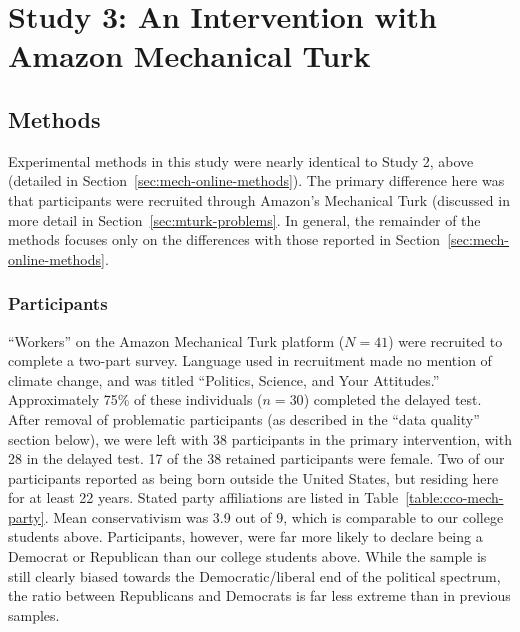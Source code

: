 \section{Study 3: An Intervention with Amazon Mechanical Turk}
\label{sec:mech-mturk}

\subsection{Methods}

Experimental methods in this study were nearly identical to Study 2, above
(detailed in Section~\ref{sec:mech-online-methods}). The primary difference here
was that participants were recruited through Amazon's Mechanical Turk (discussed
in more detail in Section~\ref{sec:mturk-problems}. In general, the remainder of the
methods focuses only on the differences with those reported in
Section~\ref{sec:mech-online-methods}.

\subsubsection{Participants}

“Workers” on the Amazon Mechanical Turk platform ($N=41$) were recruited to
complete a two-part survey. Language used in recruitment made no mention of
climate change, and was titled “Politics, Science, and Your Attitudes.”
Approximately 75\% of these individuals ($n=30$) completed the delayed test.
After removal of problematic participants (as described in the “data quality”
section below), we were left with 38 participants in the primary intervention,
with 28 in the delayed test. 17 of the 38 retained participants were female.
Two of our participants reported as being born outside the United States, but
residing here for at least 22 years. Stated party affiliations are listed in
Table~\ref{table:cco-mech-party}. Mean conservativism was 3.9 out of 9, which is
comparable to our college students above. Participants, however, were far more
likely to declare being a Democrat or Republican than our college students above.
While the sample is still clearly biased towards the Democratic/liberal end of
the political spectrum, the ratio between Republicans and Democrats is far less
extreme than in previous samples. 

